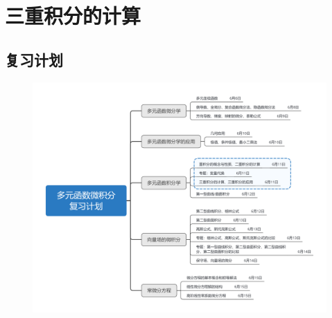 \documentclass[12pt,UTF8]{ctexart}
\begin{document}
\setcounter{section}{7}
\section{三重积分的计算}
\noindent
\subsection{复习计划}
\begin{figure}[H]
\begin{center}
\includegraphics[height=0.5\textheight]{Figures20190611/plan.png}
\end{center}
\end{figure}
\end{document}
